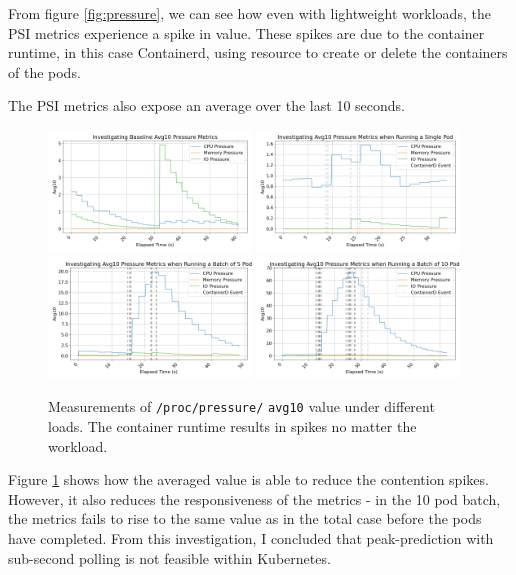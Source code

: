 From figure \ref{fig:pressure}, we can see how even with lightweight workloads,
the PSI metrics experience a spike in value. These spikes are due to the
container runtime, in this case Containerd, using resource to create or delete
the containers of the pods.

The PSI metrics also expose an average over the last 10 seconds.
\begin{figure}[H]
    \centering
    \includegraphics[width=0.48\textwidth]{images/avg-pressure-baseline.png}
    \includegraphics[width=0.48\textwidth]{images/avg-pressure-single.png} \\
    \includegraphics[width=0.48\textwidth]{images/avg-pressure-smallbatch.png}
    \includegraphics[width=0.48\textwidth]{images/avg-pressure-bigbatch.png}
    \caption{Measurements of \texttt{/proc/pressure/} \texttt{avg10} value
    under different loads. The container runtime results in spikes no matter the
    workload.} \label{fig:pressure-avg}
\end{figure}
Figure \ref{fig:pressure-avg} shows how the averaged value is able to reduce the
contention spikes. However, it also reduces the responsiveness of the metrics -
in the 10 pod batch, the metrics fails to rise to the same value as in the
total case before the pods have completed. From this investigation, I concluded
that peak-prediction with sub-second polling is not feasible within Kubernetes.

